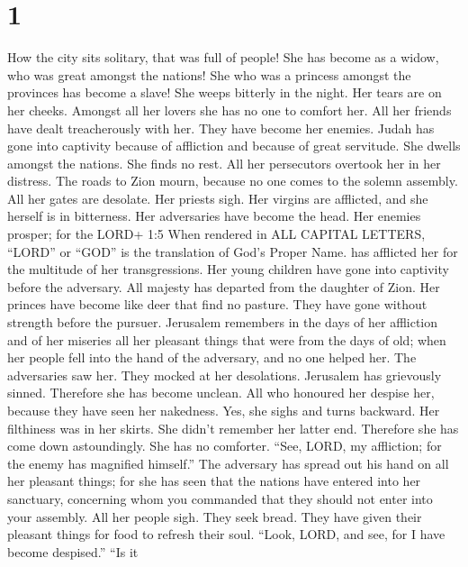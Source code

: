 \hypertarget{section}{%
\section{1}\label{section}}

 How the city sits solitary, that was full of people! She
has become as a widow, who was great amongst the nations! She who was a
princess amongst the provinces has become a slave!  She
weeps bitterly in the night. Her tears are on her cheeks. Amongst all
her lovers she has no one to comfort her. All her friends have dealt
treacherously with her. They have become her enemies.  Judah
has gone into captivity because of affliction and because of great
servitude. She dwells amongst the nations. She finds no rest. All her
persecutors overtook her in her distress.  The roads to Zion
mourn, because no one comes to the solemn assembly. All her gates are
desolate. Her priests sigh. Her virgins are afflicted, and she herself
is in bitterness.  Her adversaries have become the head. Her
enemies prosper; for the LORD+ 1:5 When rendered in ALL CAPITAL LETTERS,
``LORD'' or ``GOD'' is the translation of God's Proper Name. has
afflicted her for the multitude of her transgressions. Her young
children have gone into captivity before the adversary.  All
majesty has departed from the daughter of Zion. Her princes have become
like deer that find no pasture. They have gone without strength before
the pursuer.  Jerusalem remembers in the days of her
affliction and of her miseries all her pleasant things that were from
the days of old; when her people fell into the hand of the adversary,
and no one helped her. The adversaries saw her. They mocked at her
desolations.  Jerusalem has grievously sinned. Therefore she
has become unclean. All who honoured her despise her, because they have
seen her nakedness. Yes, she sighs and turns backward.  Her
filthiness was in her skirts. She didn't remember her latter end.
Therefore she has come down astoundingly. She has no comforter. ``See,
LORD, my affliction; for the enemy has magnified himself.''
 The adversary has spread out his hand on all her pleasant
things; for she has seen that the nations have entered into her
sanctuary, concerning whom you commanded that they should not enter into
your assembly.  All her people sigh. They seek bread. They
have given their pleasant things for food to refresh their soul. ``Look,
LORD, and see, for I have become despised.''  ``Is it
